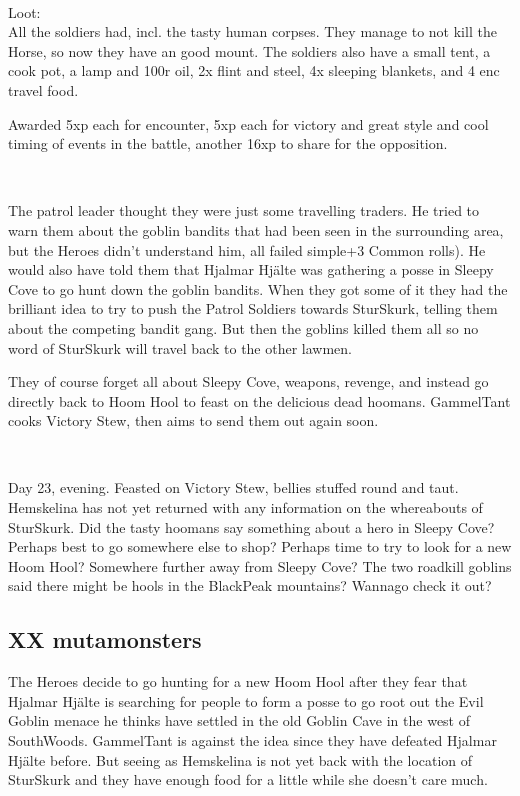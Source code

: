 \

Loot:\\
All the soldiers had, incl. the tasty human corpses. They manage to not kill the Horse, so now they have an good mount. The soldiers also have a small tent, a cook pot, a lamp and 100r oil, 2x flint and steel, 4x sleeping blankets, and 4 enc travel food.

Awarded 5xp each for encounter, 5xp each for victory and great style and cool timing of events in the battle, another 16xp to share for the opposition.

\

The patrol leader thought they were just some travelling traders. He tried to warn them about the goblin bandits that had been seen in the surrounding area, but the Heroes didn't understand him, all failed simple+3 Common rolls). He would also have told them that Hjalmar Hjälte was gathering a posse in Sleepy Cove to go hunt down the goblin bandits. When they got some of it they had the brilliant idea to try to push the Patrol Soldiers towards SturSkurk, telling them about the competing bandit gang. But then the goblins killed them all so no word of SturSkurk will travel back to the other lawmen.

They of course forget all about Sleepy Cove, weapons, revenge, and instead go directly back to Hoom Hool to feast on the delicious dead hoomans. GammelTant cooks Victory Stew, then aims to send them out again soon.

\

Day 23, evening. Feasted on Victory Stew, bellies stuffed round and taut. Hemskelina has not yet returned with any information on the whereabouts of SturSkurk. Did the tasty hoomans say something about a hero in Sleepy Cove? Perhaps best to go somewhere else to shop? Perhaps time to try to look for a new Hoom Hool? Somewhere further away from Sleepy Cove? The two roadkill goblins said there might be hools in the BlackPeak mountains? Wannago check it out?


\subsection*{XX mutamonsters}

The Heroes decide to go hunting for a new Hoom Hool after they fear that Hjalmar Hjälte is searching for people to form a posse to go root out the Evil Goblin menace he thinks have settled in the old Goblin Cave in the west of SouthWoods. GammelTant is against the idea since they have defeated Hjalmar Hjälte before. But seeing as Hemskelina is not yet back with the location of SturSkurk and they have enough food for a little while she doesn't care much.

